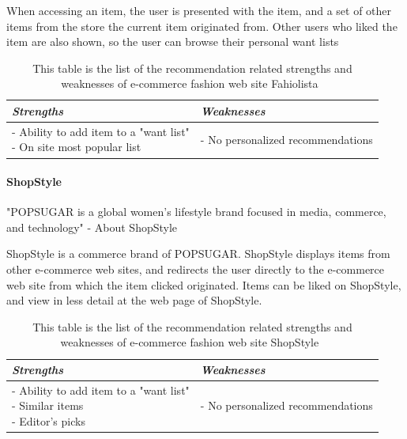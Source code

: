     When accessing an item, the user is presented with the item, and a set of other items from the store the current item originated from.
    Other users who liked the item are also shown, so the user can browse their personal want lists
    \begin{table}[H]
        \centering
        \begin{tabular}{l|l}
            \toprule
            \emph{Strengths} & \emph{Weaknesses} \\ \hline
            \pbox{9cm}{
                - Ability to add item to a "want list" \\
                - On site most popular list \\
            } & \pbox{9cm}{
                - No personalized recommendations \\
            } \\ \bottomrule
        \end{tabular}
        \caption[Recommendation related strengths and weaknesses of Fahiolista~\cite{Fahiolista}]{This table is the list of the recommendation related strengths and weaknesses of e-commerce fashion web site Fahiolista~\cite{Fahiolista}}
        \label{table:ecommenreceFahiolista}
    \end{table}

\paragraph{ShopStyle} %
\label{par:shopstyle}
    "POPSUGAR is a global women's lifestyle brand focused in media, commerce, and technology" - About ShopStyle~\cite{ShopStyle}

    ShopStyle is a commerce brand of POPSUGAR.
    ShopStyle displays items from other e-commerce web sites, and redirects the user directly to the e-commerce web site from which the item clicked originated.
    Items can be liked on ShopStyle, and view in less detail at the web page of ShopStyle.
    \begin{table}[H]
        \centering
        \begin{tabular}{l|l}
            \toprule
            \emph{Strengths} & \emph{Weaknesses} \\ \hline
            \pbox{9cm}{
                - Ability to add item to a "want list" \\
                - Similar items \\
                - Editor's picks
            } & \pbox{9cm}{
                - No personalized recommendations \\
            } \\ \bottomrule
        \end{tabular}
        \caption[Recommendation related strengths and weaknesses of ShopStyle~\cite{ShopStyle}]{This table is the list of the recommendation related strengths and weaknesses of e-commerce fashion web site ShopStyle~\cite{ShopStyle}}
        \label{table:ecommenreceShopStyle}
    \end{table}

